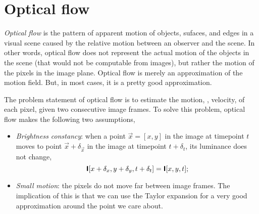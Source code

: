 \section{Optical flow}

\textit{Optical flow} is the pattern of apparent motion of objects, sufaces,
and edges in a visual scene caused by the relative motion between an observer
and the scene. In other words, optical flow does not represent the actual
motion of the objects in the scene (that would not be computable from images),
but rather the motion of the pixels in the image plane. Optical flow is merely
an approximation of the motion field. But, in most cases, it is a pretty good
approximation.

The problem statement of optical flow is to estimate the motion, \ie, velocity,
of each pixel, given two consecutive image frames. To solve this problem,
optical flow makes the following two assumptions,
\begin{itemize}
  \item \textit{Brightness constancy}: when a point $\vec{x}=[x, y]$ in the
    image at timepoint $t$ moves to point $\vec{x}+\delta_{\vec{x}}$ in the
    image at timepoint $t+\delta_t$, its luminance does not change, \[
      \bm{\mathsf{I}}[x+\delta_x,y+\delta_y,t+\delta_t] = \bm{\mathsf{I}}[x,y,t]
    ;\]
  \item \textit{Small motion}: the pixels do not move far between image frames.
    The implication of this is that we can use the Taylor expansion for a very
    good approximation around the point we care about.
\end{itemize}

